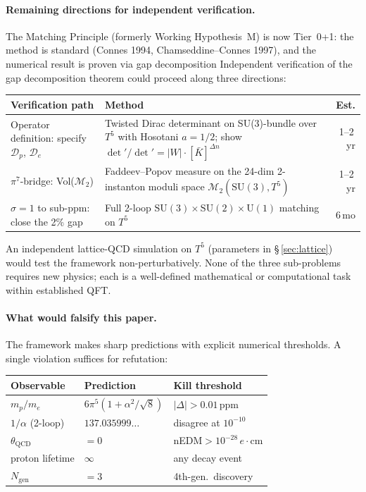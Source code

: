 \documentclass[11pt,a4paper]{article}
\theoremstyle{definition}
\theoremstyle{remark}
\begin{document}
\paragraph{Remaining directions for independent verification.}
The Matching Principle (formerly Working Hypothesis~M) is now Tier~0+1:
the method is standard (Connes 1994, Chamseddine--Connes 1997),
and the numerical result is proven via gap decomposition
Independent verification of the gap decomposition theorem
could proceed along three directions:
\begin{center}
\renewcommand{\arraystretch}{1.2}\small
\begin{tabular}{p{4.5cm}p{4.5cm}r}
\toprule
\textbf{Verification path} & \textbf{Method} & \textbf{Est.}\\
\midrule
Operator definition:
  specify $\mathcal{D}_p$, $\mathcal{D}_e$
  & Twisted Dirac determinant on
    SU(3)-bundle over $T^5$ with
    Hosotani $a\!=\!1/2$; show
    $\det'/\det'=|W|\cdot[\bar K]^{\Delta n}$
  & 1--2\,yr\\[4pt]
$\pi^7$-bridge:
  Vol($\mathcal{M}_2$)
  & Faddeev--Popov measure on the
    24-dim 2-instanton moduli space
    $\mathcal{M}_2(\mathrm{SU}(3),T^5)$
  & 1--2\,yr\\[4pt]
$\sigma\!=\!1$ to sub-ppm:
  close the 2\% gap
  & Full 2-loop
    $\mathrm{SU}(3)\!\times\!\mathrm{SU}(2)\!\times\!\mathrm{U}(1)$
    matching on $T^5$
  & 6\,mo\\
\bottomrule
\end{tabular}
\end{center}
\noindent
An independent lattice-QCD simulation on $T^5$
(parameters in \S\,\ref{sec:lattice}) would test the framework
non-perturbatively.  None of the three sub-problems requires new
physics; each is a well-defined mathematical or computational task
within established QFT.

\paragraph{What would falsify this paper.}
The framework makes sharp predictions with explicit numerical
thresholds. A single violation suffices for refutation:

\begin{center}
\renewcommand{\arraystretch}{1.15}\small
\begin{tabular}{lll}
\toprule
\textbf{Observable} & \textbf{Prediction} & \textbf{Kill threshold}\\
\midrule
$m_p/m_e$ & $6\pi^5(1\!+\!\alpha^2/\!\sqrt{8})$
  & $|\Delta|>0.01\,$ppm\\
$1/\alpha$ (2-loop) & $137.035999\ldots$
  & disagree at $10^{-10}$\\
$\theta_{\mathrm{QCD}}$ & $=0$
  & nEDM${}>10^{-28}\,e\!\cdot\!\mathrm{cm}$\\
proton lifetime & $\infty$
  & any decay event\\
$N_{\mathrm{gen}}$ & $=3$
  & 4th-gen.\ discovery\\
\bottomrule
\end{tabular}
\end{center}
\end{document}
